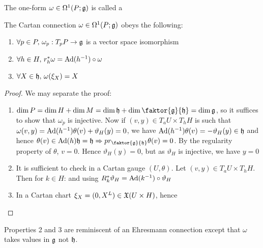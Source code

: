 \documentclass{article}
\begin{document}
\begin{definition}
The one-form $\omega \in \Omega^1(P;\mathfrak{g})$ is called a 
\end{definition}

\begin{prop}
The Cartan connection $\omega \in \Omega^1(P;\mathfrak{g})$ obeys the following:
\begin{enumerate}
    \item $\forall p \in P, \, \omega_p : T_pP \to \mathfrak{g}$ is a vector space isomorphism 
    \item $\forall h \in H, \, r_h^\ast \omega = \operatorname{Ad}(h^{-1})\circ \omega$
    \item $\forall X \in \mathfrak{h}, \, \omega(\xi_X) = X$
\end{enumerate}
\end{prop}
\begin{proof}
We may separate the proof:
\begin{enumerate}
    \item $\dim P = \dim H + \dim M = \dim \mf{h} + \dim \faktor{\mf{g}}{\mf{h}} = \dim \mf{g}$, so it suffices to show that $\omega_p$ is injective. Now if $(v,y) \in T_a U \times T_h H$ is such that $\omega(v,y) = \operatorname{Ad}(h^{-1})\theta(v) + \vartheta_H(y)=0$, we have $\operatorname{Ad}(h^{-1}) \theta(v) = -\vartheta_H(y) \in \mathfrak{h}$ and hence $\theta(v) \in \Ad(h)\mf{h} = \mf{h} \Rightarrow pr_{\faktor{\mf{g}}{\mf{h}}}\theta(v) = 0$. By the regularity property of $\theta$, $v=0$. Hence $\vartheta_H(y) = 0$, but as $\vartheta_H$ is injective, we have $y=0$ 
    \item It is sufficient to check in a Cartan gauge $(U,\theta)$. Let $(v,y)\in T_aU \times T_hH$. Then for $k \in H$:
    and using $R_k^\ast \vartheta_H = \operatorname{Ad}(k^{-1})\circ \vartheta_H$
    \item In a Cartan chart $\xi_X = (0,X^L) \in \mathfrak{X}(U \times H)$, hence 
\end{enumerate}
\end{proof}

\begin{remark}
Properties 2 and 3 are reminiscent of an Ehresmann connection except that $\omega$ takes values in $\mathfrak{g}$ not $\mathfrak{h}$. 
\end{remark}
\end{document}
